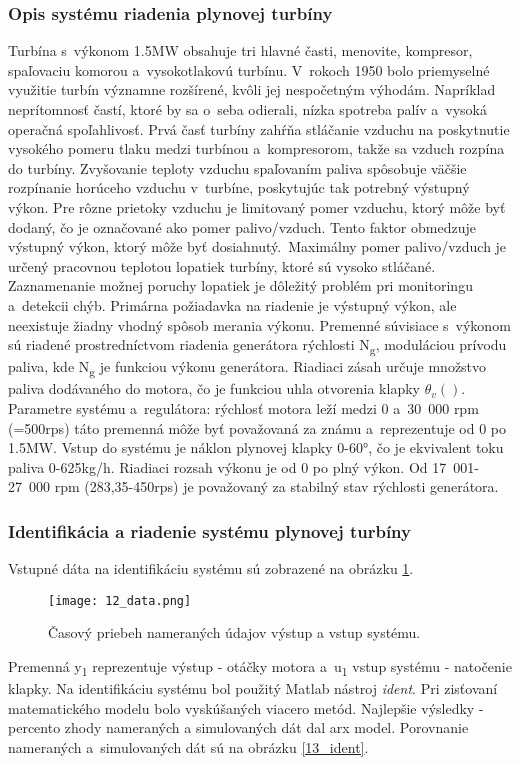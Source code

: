 \subsubsection{Opis systému riadenia plynovej turbíny}
Turbína s~výkonom 1.5MW obsahuje tri hlavné časti, menovite, kompresor,
spaľovaciu komorou a~vysokotlakovú turbínu. V~rokoch 1950 bolo
priemyselné využitie turbín významne rozšírené, kvôli jej nespočetným
výhodám. Napríklad neprítomnosť častí, ktoré by sa o~seba odierali,
nízka spotreba palív a~vysoká operačná spoľahlivosť. Prvá časť turbíny
zahŕňa stláčanie vzduchu na poskytnutie vysokého pomeru tlaku medzi
turbínou a~kompresorom, takže sa vzduch rozpína do turbíny. Zvyšovanie
teploty vzduchu spaľovaním paliva spôsobuje väčšie rozpínanie horúceho
vzduchu v~turbíne, poskytujúc tak potrebný výstupný výkon. Pre rôzne
prietoky vzduchu je limitovaný pomer vzduchu, ktorý môže byť dodaný, čo
je označované ako pomer palivo/vzduch. Tento faktor obmedzuje výstupný
výkon, ktorý môže byť dosiahnutý.~Maximálny pomer palivo/vzduch je
určený pracovnou teplotou lopatiek turbíny, ktoré sú vysoko stláčané.
Zaznamenanie možnej poruchy lopatiek je dôležitý problém pri monitoringu
a~detekcii chýb. Primárna požiadavka na riadenie je výstupný výkon, ale
neexistuje žiadny vhodný spôsob merania výkonu. Premenné súvisiace
s~výkonom sú riadené prostredníctvom riadenia generátora rýchlosti
N\textsubscript{g}, moduláciou prívodu paliva, kde N\textsubscript{g} je
funkciou výkonu generátora. Riadiaci zásah určuje množstvo paliva
dodávaného do motora, čo je funkciou uhla otvorenia klapky
\(\theta_{v}\left( \right).\) Parametre systému a~regulátora: rýchlosť
motora leží medzi 0 a~30~000 rpm (=500rps) táto premenná môže byť
považovaná za známu a~reprezentuje od 0 po 1.5MW. Vstup do systému je
náklon plynovej klapky 0-60°, čo je ekvivalent toku paliva 0-625kg/h.
Riadiaci rozsah výkonu je od 0 po plný výkon. Od 17~001-27~000 rpm
(283,35-450rps) je považovaný za stabilný stav rýchlosti generátora.\cite{MPC07}
\subsubsection{Identifikácia a riadenie systému plynovej turbíny}
Vstupné dáta na identifikáciu systému sú zobrazené na obrázku  \ref{12_data}. 

\begin{figure}[!htbp]
\centering
\texttt{[image: 12\_data.png]}
\caption{Časový priebeh nameraných údajov výstup a vstup systému.}
\label{12_data}
\end{figure}
Premenná y\textsubscript{1} reprezentuje výstup - otáčky motora a~u\textsubscript{1}
vstup systému - natočenie klapky. Na identifikáciu systému bol použitý Matlab nástroj \textit{ident}. Pri zisťovaní matematického modelu bolo vyskúšaných viacero metód. Najlepšie
výsledky - percento zhody nameraných a simulovaných dát dal arx model. Porovnanie nameraných a~simulovaných dát sú na
obrázku \ref{13_ident}.


